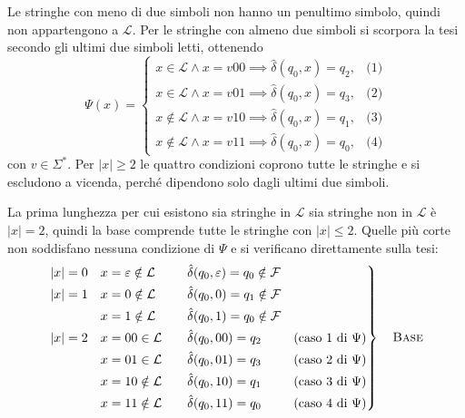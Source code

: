 \documentclass[a4paper, 11pt, oneside]{book}
\theoremstyle{formale}
\begin{document}
    Le stringhe con meno di due simboli non hanno un penultimo simbolo, quindi non
    appartengono a $\mathcal{L}$. Per le stringhe con almeno due simboli si scorpora la
    tesi secondo gli ultimi due simboli letti, ottenendo
    \begin{equation*}
        \Psi(x) =
        \begin{cases}
            x \in \mathcal{L} \land x = v00 \implies \hat{\delta}(q_0, x) = q_2,
                & \text{(1)} \\
            x \in \mathcal{L} \land x = v01 \implies \hat{\delta}(q_0, x) = q_3,
                & \text{(2)} \\
            x \notin \mathcal{L} \land x = v10 \implies \hat{\delta}(q_0, x) = q_1,
                & \text{(3)} \\
            x \notin \mathcal{L} \land x = v11 \implies \hat{\delta}(q_0, x) = q_0,
                & \text{(4)}
        \end{cases}
    \end{equation*}
    con $v \in \Sigma^*$. Per $|x| \geq 2$ le quattro condizioni coprono tutte le stringhe
    e si escludono a vicenda, perch\'e dipendono solo dagli ultimi due simboli.

    La prima lunghezza per cui esistono sia stringhe in $\mathcal{L}$ sia stringhe non in
    $\mathcal{L}$ \`e $|x| = 2$, quindi la base comprende tutte le stringhe con
    $|x| \leq 2$. Quelle pi\`u corte non soddisfano nessuna condizione di $\Psi$ e si
    verificano direttamente sulla tesi:
    \begin{equation*}
        \left.
        \begin{alignedat}{3}
            |x| = 0 \quad & x = \varepsilon \notin \mathcal{L} & \qquad
                & \hat{\delta}(q_0, \varepsilon) = q_0 \notin \mathcal{F} & & \\
            |x| = 1 \quad & x = 0 \notin \mathcal{L} &
                & \hat{\delta}(q_0, 0) = q_1 \notin \mathcal{F} & & \\
            & x = 1 \notin \mathcal{L} &
                & \hat{\delta}(q_0, 1) = q_0 \notin \mathcal{F} & & \\
            |x| = 2 \quad & x = 00 \in \mathcal{L} &
                & \hat{\delta}(q_0, 00) = q_2
                &\quad & \text{(caso 1 di $\Psi$)} \\
            & x = 01 \in \mathcal{L} &
                & \hat{\delta}(q_0, 01) = q_3
                && \text{(caso 2 di $\Psi$)} \\
            & x = 10 \notin \mathcal{L} &
                & \hat{\delta}(q_0, 10) = q_1
                && \text{(caso 3 di $\Psi$)} \\
            & x = 11 \notin \mathcal{L} &
                & \hat{\delta}(q_0, 11) = q_0
                && \text{(caso 4 di $\Psi$)}
        \end{alignedat}
        \right\}
        \quad \text{\textsc{Base}}
    \end{equation*}
\end{document}
